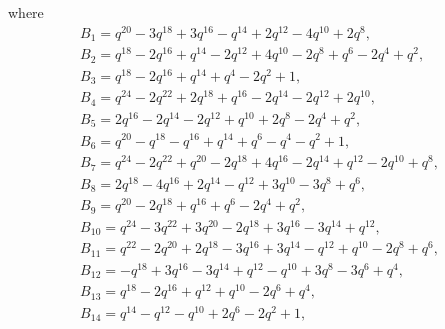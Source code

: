 \documentclass[10pt,a4paper]{amsart}
\numberwithin{equation}{section}
\theoremstyle{definition}
\newcommand{\flac}[2]{#1}
\begin{document}
where
\begin{gather*}
 B_1 =
\flac{q^{20}}{a^2}-\flac{3q^{18}}{a^2}+\flac{3q^{16}}{a^2}-\flac{q^{14}}{a^2}+\flac{2q^{12}}{a^2}-\flac{4q^{10}}{a^2}+\flac{2q^{8}}{a^2}, \\
 B_2 =
\flac{q^{18}}{a^2}-\flac{2q^{16}}{a^2}+\flac{q^{14}}{a^2}-\flac{2q^{12}}{a^2}+\flac{4q^{10}}{a^2}-\flac{2q^{8}}{a^2}+\flac{q^{6}}{a^2}-\flac{2q^{4}}{a^2}+\flac{q^{2}}{a^2}, \\
 B_3 =
\flac{q^{18}}{a^2}-\flac{2q^{16}}{a^2}+\flac{q^{14}}{a^2}+\flac{q^{4}}{a^2}-\flac{2q^{2}}{a^2}+\flac{1}{a^2}, \\
 B_4 =
\flac{q^{24}}{a^2}-\flac{2q^{22}}{a^2}+\flac{2q^{18}}{a^2}+\flac{q^{16}}{a^2}-\flac{2q^{14}}{a^2}-\flac{2q^{12}}{a^2}+\flac{2q^{10}}{a^2}, \\
 B_5 =
\flac{2q^{16}}{a^2}-\flac{2q^{14}}{a^2}-\flac{2q^{12}}{a^2}+\flac{q^{10}}{a^2}+\flac{2q^{8}}{a^2}-\flac{2q^{4}}{a^2}+\flac{q^{2}}{a^2},\\
 B_6 =
\flac{q^{20}}{a^2}-\flac{q^{18}}{a^2}-\flac{q^{16}}{a^2}+\flac{q^{14}}{a^2}+\flac{q^{6}}{a^2}-\flac{q^{4}}{a^2}-\flac{q^{2}}{a^2}+\flac{1}{a^2}, \\
 B_7 =
\flac{q^{24}}{a^2}-\flac{2q^{22}}{a^2}+\flac{q^{20}}{a^2}-\flac{2q^{18}}{a^2}+\flac{4q^{16}}{a^2}-\flac{2q^{14}}{a^2}+\flac{q^{12}}{a^2}-\flac{2q^{10}}{a^2}+\flac{q^{8}}{a^2}, \\
 B_8 =
\flac{2q^{18}}{a^2}-\flac{4q^{16}}{a^2}+\flac{2q^{14}}{a^2}-\flac{q^{12}}{a^2}+\flac{3q^{10}}{a^2}-\flac{3q^{8}}{a^2}+\flac{q^{6}}{a^2}, \\
 B_9 =
\flac{q^{20}}{a^2}-\flac{2q^{18}}{a^2}+\flac{q^{16}}{a^2}+\flac{q^{6}}{a^2}-\flac{2q^{4}}{a^2}+\flac{q^{2}}{a^2}, \\
 B_{10} =
\flac{q^{24}}{a^2}-\flac{3q^{22}}{a^2}+\flac{3q^{20}}{a^2}-\flac{2q^{18}}{a^2}+\flac{3q^{16}}{a^2}-\flac{3q^{14}}{a^2}+\flac{q^{12}}{a^2}, \\
 B_{11} =
\flac{q^{22}}{a^2}-\flac{2q^{20}}{a^2}+\flac{2q^{18}}{a^2}-\flac{3q^{16}}{a^2}+\flac{3q^{14}}{a^2}-\flac{q^{12}}{a^2}+\flac{q^{10}}{a^2}-\flac{2q^{8}}{a^2}+\flac{q^{6}}{a^2},\\
 B_{12} =
-\flac{q^{18}}{a^2}+\flac{3q^{16}}{a^2}-\flac{3q^{14}}{a^2}+\flac{q^{12}}{a^2}-\flac{q^{10}}{a^2}+\flac{3q^{8}}{a^2}-\flac{3q^{6}}{a^2}+\flac{q^{4}}{a^2}, \\
 B_{13} =
\flac{q^{18}}{a^2}-\flac{2q^{16}}{a^2}+\flac{q^{12}}{a^2}+\flac{q^{10}}{a^2}-\flac{2q^{6}}{a^2}+\flac{q^{4}}{a^2}, \\
 B_{14} =
\flac{q^{14}}{a^2}-\flac{q^{12}}{a^2}-\flac{q^{10}}{a^2}+\flac{2q^{6}}{a^2}-\flac{2q^{2}}{a^2}+\flac{1}{a^2}, \\

\end{gather*}
\end{document}
